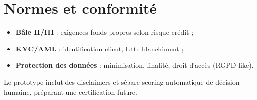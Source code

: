 \section{Normes et conformité}

\begin{itemize}[leftmargin=*]
  \item \textbf{Bâle II/III} : exigences fonds propres selon risque crédit ;
  \item \textbf{KYC/AML} : identification client, lutte blanchiment ;
  \item \textbf{Protection des données} : minimisation, finalité, droit d'accès (RGPD-like).
\end{itemize}

Le prototype inclut des disclaimers et sépare scoring automatique de décision humaine, préparant une certification future.
